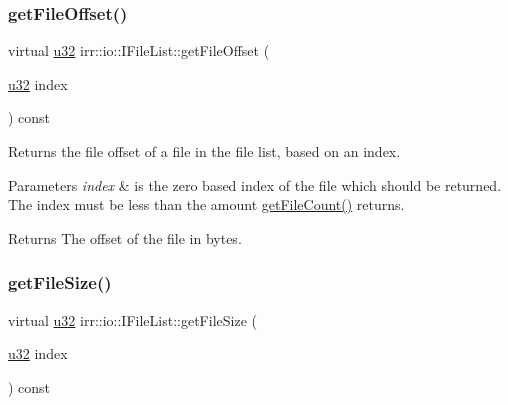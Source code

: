 \subsubsection{\texorpdfstring{get\+File\+Offset()}{getFileOffset()}\hspace{0.1cm}{\footnotesize\ttfamily [2/2]}}
{\footnotesize\ttfamily virtual \hyperlink{namespaceirr_a0416a53257075833e7002efd0a18e804}{u32} irr\+::io\+::\+I\+File\+List\+::get\+File\+Offset (\begin{DoxyParamCaption}\item[{\hyperlink{namespaceirr_a0416a53257075833e7002efd0a18e804}{u32}}]{index }\end{DoxyParamCaption}) const\hspace{0.3cm}{\ttfamily [pure virtual]}}



Returns the file offset of a file in the file list, based on an index. 


\begin{DoxyParams}{Parameters}
{\em index} & is the zero based index of the file which should be returned. The index must be less than the amount \hyperlink{classirr_1_1io_1_1IFileList_a871861be76e18d58274c4580b1d103b9}{get\+File\+Count()} returns. \\
\hline
\end{DoxyParams}
\begin{DoxyReturn}{Returns}
The offset of the file in bytes. 
\end{DoxyReturn}
\mbox{\label{classirr_1_1io_1_1IFileList_a305561d0c5db74ac721da5d26c461b36}} 
\subsubsection{\texorpdfstring{get\+File\+Size()}{getFileSize()}\hspace{0.1cm}{\footnotesize\ttfamily [1/2]}}
{\footnotesize\ttfamily virtual \hyperlink{namespaceirr_a0416a53257075833e7002efd0a18e804}{u32} irr\+::io\+::\+I\+File\+List\+::get\+File\+Size (\begin{DoxyParamCaption}\item[{\hyperlink{namespaceirr_a0416a53257075833e7002efd0a18e804}{u32}}]{index }\end{DoxyParamCaption}) const\hspace{0.3cm}{\ttfamily [pure virtual]}}



